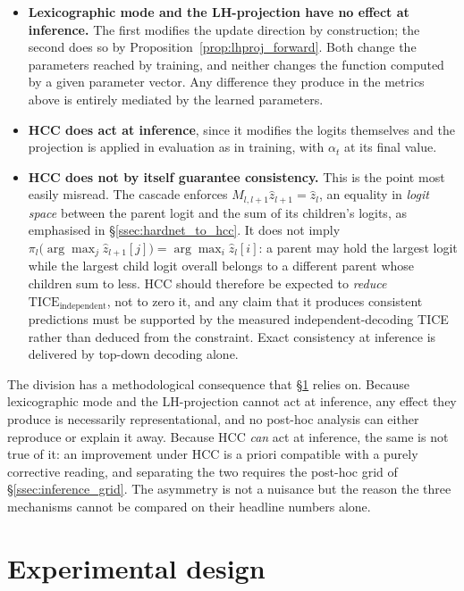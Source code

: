 \begin{itemize}
    \item \textbf{Lexicographic mode and the LH-projection have no effect at
    inference.} The first modifies the update direction by construction; the
    second does so by Proposition~\ref{prop:lhproj_forward}. Both change the
    parameters reached by training, and neither changes the function computed by a
    given parameter vector. Any difference they produce in the metrics above is
    entirely mediated by the learned parameters.
    \item \textbf{HCC does act at inference}, since it modifies the logits
    themselves and the projection is applied in evaluation as in training, with
    $\alpha_t$ at its final value.
    \item \textbf{HCC does not by itself guarantee consistency.} This is the point
    most easily misread. The cascade enforces $M_{l,l+1}\hat z_{l+1}=\hat z_l$, an
    equality in \emph{logit space} between the parent logit and the sum of its
    children's logits, as emphasised in \S\ref{ssec:hardnet_to_hcc}. It does not
    imply
    $\pi_l\big(\arg\max_j \hat z_{l+1}[j]\big)=\arg\max_i \hat z_l[i]$: a parent
    may hold the largest logit while the largest child logit overall belongs to a
    different parent whose children sum to less. HCC should therefore be expected
    to \emph{reduce} $\mathrm{TICE}_{\text{independent}}$, not to zero it, and any
    claim that it produces consistent predictions must be supported by the measured
    independent-decoding TICE rather than deduced from the constraint. Exact
    consistency at inference is delivered by top-down decoding alone.
\end{itemize}

The division has a methodological consequence that
\S\ref{sec:methodology_design} relies on. Because lexicographic mode and the
LH-projection cannot act at inference, any effect they produce is necessarily
representational, and no post-hoc analysis can either reproduce or explain it
away. Because HCC \emph{can} act at inference, the same is not true of it: an
improvement under HCC is a priori compatible with a purely corrective reading,
and separating the two requires the post-hoc grid of
\S\ref{ssec:inference_grid}. The asymmetry is not a nuisance but the reason the
three mechanisms cannot be compared on their headline numbers alone.



\section{Experimental design}
\label{sec:methodology_design}


